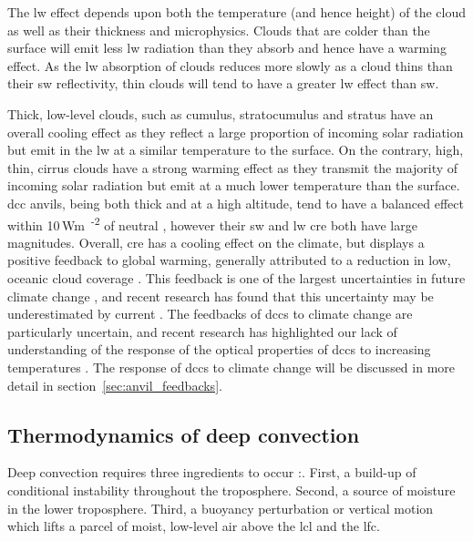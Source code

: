 The \acrshort{lw} effect depends upon both the temperature (and hence height) of the cloud as well as their thickness and microphysics.
Clouds that are colder than the surface will emit less \acrshort{lw} radiation than they absorb and hence have a warming effect.
As the \acrshort{lw} absorption of clouds reduces more slowly as a cloud thins than their \acrshort{sw} reflectivity, thin clouds will tend to have a greater \acrshort{lw} effect than \acrshort{sw}.

Thick, low-level clouds, such as cumulus, stratocumulus and stratus have an overall cooling effect as they reflect a large proportion of incoming solar radiation but emit in the \acrshort{lw} at a similar temperature to the surface. 
On the contrary, high, thin, cirrus clouds have a strong warming effect as they transmit the majority of incoming solar radiation but emit at a much lower temperature than the surface. 
\acrshort{dcc} anvils, being both thick and at a high altitude, tend to have a balanced effect within 10\,\unit{Wm\textsuperscript{-2}} of neutral \citep{ramanathan_cloud-radiative_1989, hartmann_effect_1992, hartmann_tropical_2016}, however their \acrshort{sw} and \acrshort{lw} \acrshort{cre} both have large magnitudes. 
Overall, \acrshort{cre} has a cooling effect on the climate, but displays a positive feedback to global warming, generally attributed to a reduction in low, oceanic cloud coverage \citep{bony_clouds_2015}. 
This feedback is one of the largest uncertainties in future climate change \citep{sherwood_assessment_2020}, and recent research has found that this uncertainty may be underestimated by current  \citep{hill_climate_2023}.
The feedbacks of \acrshort{dcc}s to climate change are particularly uncertain, and recent research has highlighted our lack of understanding of the response of the optical properties of \acrshort{dcc}s to increasing temperatures \citep{mckim_weak_2024}.
The response of \acrshort{dcc}s to climate change will be discussed in more detail in section~\ref{sec:anvil_feedbacks}.


\subsection{Thermodynamics of deep convection}

Deep convection requires three ingredients to occur \citep{brooks_century_2019}:. 
First, a build-up of conditional instability throughout the troposphere. 
Second, a source of moisture in the lower troposphere. 
Third, a buoyancy perturbation or vertical motion which lifts a parcel of moist, low-level air above the \acrfull{lcl} and the \acrfull{lfc}.

